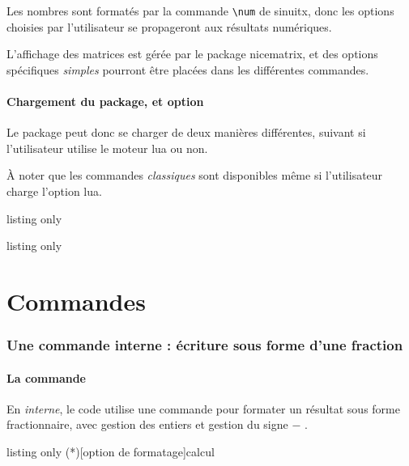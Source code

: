 \documentclass[a4paper,11pt]{article}
\begin{document}
Les nombres sont formatés par la commande \texttt{\textbackslash num} de \textsf{sinuitx}, donc les options choisies par l'utilisateur se propageront aux résultats numériques.

\smallskip

L'affichage des matrices est gérée par le package \textsf{nicematrix}, et des options spécifiques \textit{simples} pourront être placées dans les différentes commandes.

\subsection{Chargement du package, et option}

Le package peut donc se charger de deux manières différentes, suivant si l'utilisateur utilise le moteur \textsf{lua} ou non.

À noter que les commandes \textit{classiques} sont disponibles même si l'utilisateur charge l'option \textsf{lua}.

\begin{PresentationCode}{listing only}
\usepackage{ResolSystemes}
\end{PresentationCode}

\begin{PresentationCode}{listing only}
\usepackage[options]{pyluatex}
\usepackage[lua]{ResolSystemes}
\end{PresentationCode}

\pagebreak

\part{Commandes}

\section{Une commande interne : écriture sous forme d'une fraction}

\subsection{La commande}

En \textit{interne}, le code utilise une commande pour formater un résultat sous forme fractionnaire, avec gestion des entiers et gestion du signe \og $-$ \fg.

\begin{PresentationCode}{listing only}
\ConvVersFrac(*)[option de formatage]{calcul}
\end{PresentationCode}
\end{document}
